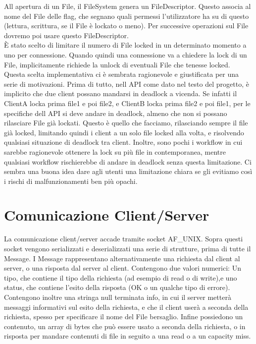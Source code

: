 \documentclass[11pt]{article}
\begin{document}
\begin{flushleft}
\begin{description}
\end{description}
All apertura  di un File, il FileSystem genera un FileDescriptor. Questo associa al nome del File delle flag, che segnano quali permessi l'utilizzatore ha su di questo (lettura, scrittura, se il File è lockato o meno). Per successive operazioni sul File dovremo poi usare questo FileDescriptor.
\\
È stato scelto di limitare il numero di File locked in un determinato momento a uno per connessione. Quando quindi una connessione va a chiedere la lock di un File, implicitamente richiede la unlock di eventuali File che tenesse locked.
Questa scelta implementativa ci è sembrata ragionevole e giustificata per una serie di motivazioni.
Prima di tutto, nell API come dato nel testo del progetto, è implicito che due client possano mandarsi in deadlock a vicenda. Se infatti il ClientA locka prima file1 e poi file2, e ClientB locka prima file2 e poi file1, per le specifiche dell API si deve andare in deadlock, almeno che non si possano rilasciare File già lockati. Questo è quello che facciamo, rilasciando sempre il file già locked, limitando quindi i client a un solo file locked alla volta, e risolvendo qualsiasi situazione di deadlock tra client.
Inoltre, sono pochi i workflow in cui sarebbe ragionevole ottenere la lock su più file in contemporanea, mentre qualsiasi workflow rischierebbe di andare in deadlock senza questa limitazione.
Ci sembra una buona idea dare agli utenti una limitazione chiara se gli evitiamo così i rischi di malfunzionamenti ben più opachi. 

\section{Comunicazione Client/Server}

La comunicazione client/server accade tramite socket AF\_UNIX.
Sopra questi socket vengono serializzati e deserializzati una serie di strutture, prima di tutte il Message.
I Message rappresentano alternativamente una richiesta dal client al server, o una risposta dal server al client. Contengono due valori numerici: Un tipo, che contiene il tipo della richiesta (ad esempio di read o di write),e uno status, che contiene l'esito della risposta (OK o un qualche tipo di errore).
Contengono inoltre una stringa null terminata info, in cui il server metterà messaggi informativi sul esito della richiesta, e che il client userà a seconda della richiesta, spesso per specificare il nome del File bersaglio. Infine possiedono un contenuto, un array di bytes che può essere usato a seconda della richiesta, o in risposta per mandare contenuti di file in seguito a una read o a un capacity miss.


\end{flushleft}
\end{document}
